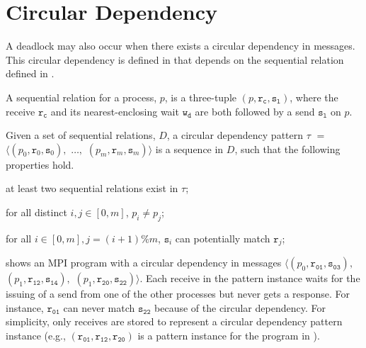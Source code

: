 \section{Circular Dependency}



A deadlock may also occur when there exists a circular dependency in messages. This circular dependency is defined in  that depends on the sequential relation defined in .

\begin{definition}
A sequential relation for a process, $p$, is a three-tuple $(p, \mathtt{r_c}, \mathtt{s_l})$, where the receive $\mathtt{r_c}$ and its nearest-enclosing wait $\mathtt{w_d}$ are both followed by a send $\mathtt{s_l}$ on $p$. 
\label{def:seqrelation}
\end{definition}

\begin{definition}
Given a set of sequential relations, $D$, a circular dependency pattern $\tau$ $=$ $\langle(p_0, \mathtt{r}_0, \mathtt{s}_0),$ $\ldots,$ $(p_m, \mathtt{r}_m, \mathtt{s}_m)\rangle$ is a sequence in $D$, such that the following properties hold.
\begin{compactenum}
\item at least two sequential relations exist in $\tau$;
\item for all distinct $i,j \in [0,m]$, $p_i \neq p_j$;
\item for all $i \in [0,m], j = (i+1) \% m$, $\mathtt{s}_i$ can potentially match $\mathtt{r}_j$;
\end{compactenum}
\label{def:circular}
\end{definition}

\examplefigthree

 shows an MPI program with a circular dependency in messages $\langle(p_0, \mathtt{r_{01}}, \mathtt{s_{03}}),$ $(p_1, \mathtt{r_{12}}, \mathtt{s_{14}}),$ $(p_1, \mathtt{r_{20}}, \mathtt{s_{22}})\rangle$. Each receive in the pattern instance waits for the issuing of a send from one of the other processes but never gets a response. For instance, $\mathtt{r_{01}}$ can never match $\mathtt{s_{22}}$ because of the circular dependency. For simplicity, only receives are stored to represent a circular dependency pattern instance (e.g., $(\mathtt{r_{01}}, \mathtt{r_{12}}, \mathtt{r_{20}})$ is a pattern instance for the program in ). 

